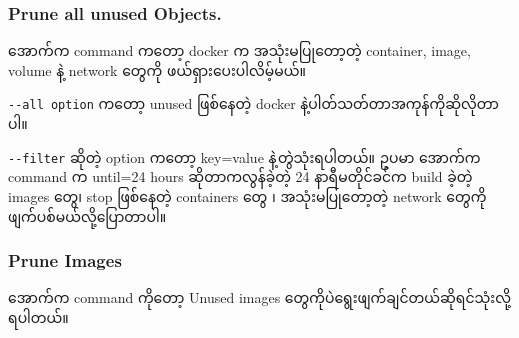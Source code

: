 \begin{Shaded}
\begin{Highlighting}[]
\NormalTok{$ }
\end{Highlighting}
\end{Shaded}

\hypertarget{prune-all-unused-objects.-1}{%
\subsubsection{Prune all unused
Objects.}\label{prune-all-unused-objects.-1}}

အောက်က command ကတော့ docker က အသုံးမပြုတော့တဲ့ container, image, volume
နဲ့ network တွေကို ဖယ်ရှားပေးပါလိမ့်မယ်။

\begin{Shaded}
\begin{Highlighting}[]
\NormalTok{$ }
\end{Highlighting}
\end{Shaded}

\texttt{-\/-‌all\ option} ကတော့ unused ဖြစ်နေတဲ့ docker
နဲ့ပါတ်သတ်တာအကုန်ကိုဆိုလိုတာပါ။

\begin{Shaded}
\begin{Highlighting}[]
\NormalTok{$ }
\end{Highlighting}
\end{Shaded}

\texttt{-\/-filter} ဆိုတဲ့ option ကတော့ key=value နဲ့တွဲသုံးရပါတယ်။ ဥပမာ
အောက်က command က until=24 hours ဆိုတာကလွန်ခဲ့တဲ့ 24 နာရီမတိုင်ခင်က build
ခဲ့တဲ့ images တွေ၊ stop ဖြစ်နေတဲ့ containers တွေ ၊ အသုံးမပြုတော့တဲ့
network တွေကိုဖျက်ပစ်မယ်လို့ပြောတာပါ။

\begin{Shaded}
\begin{Highlighting}[]
\NormalTok{$ }
\end{Highlighting}
\end{Shaded}

\hypertarget{prune-images-1}{%
\subsubsection{Prune Images}\label{prune-images-1}}

အောက်က command ကိုတော့ Unused images
တွေကိုပဲရွေးဖျက်ချင်တယ်ဆိုရင်သုံးလို့ရပါတယ်။

